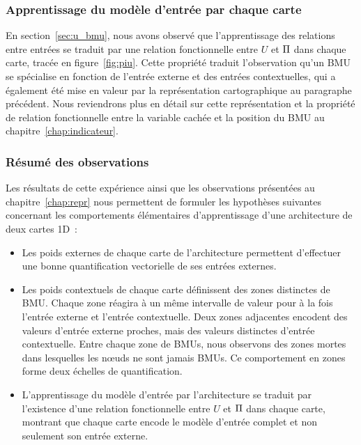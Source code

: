 \documentclass[../main]{subfiles}
\begin{document}
\subsubsection{Apprentissage du modèle d'entrée par chaque carte}

En section~\ref{sec:u_bmu}, nous avons observé que l'apprentissage des relations entre entrées se traduit par une relation fonctionnelle entre $U$ et $\Pi$ dans chaque carte, tracée en figure~\ref{fig:piu}.
Cette propriété traduit l'observation qu'un BMU se spécialise en fonction de l'entrée externe et des entrées contextuelles, qui a également été mise en valeur par la représentation cartographique au paragraphe précédent. Nous reviendrons plus en détail sur cette représentation et la propriété de relation fonctionnelle entre la variable cachée et la position du BMU au chapitre~\ref{chap:indicateur}.

\subsubsection{Résumé des observations}

Les résultats de cette expérience ainsi que les observations présentées au chapitre~\ref{chap:repr} nous permettent de formuler les hypothèses suivantes concernant les comportements élémentaires d'apprentissage d'une architecture de deux cartes 1D~:

\begin{itemize}
	\item Les poids externes de chaque carte de l'architecture permettent d'effectuer une bonne quantification vectorielle de ses entrées externes.
	\item Les poids contextuels de chaque carte définissent des zones distinctes de BMU. 
	Chaque zone réagira à un même intervalle de valeur pour à la fois l'entrée externe et l'entrée contextuelle. Deux zones adjacentes encodent des valeurs d'entrée externe proches, mais des valeurs distinctes d'entrée contextuelle.
	Entre chaque zone de BMUs, nous observons des zones mortes dans lesquelles les n\oe{}uds ne sont jamais BMUs. Ce comportement en zones forme deux échelles de quantification.
	\item L'apprentissage du modèle d'entrée par l'architecture se traduit par l'existence d'une relation fonctionnelle entre $U$ et $\Pi$ dans chaque carte, montrant que chaque carte encode le modèle d'entrée complet et non seulement son entrée externe.
\end{itemize}
\end{document}
